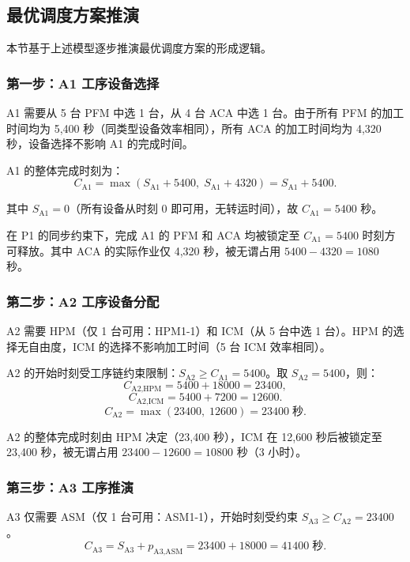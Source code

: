 \documentclass[UTF8,a4paper,12pt]{ctexart}
\begin{document}
\subsection{最优调度方案推演}
本节基于上述模型逐步推演最优调度方案的形成逻辑。

\subsubsection{第一步：A1 工序设备选择}
A1 需要从 5 台 PFM 中选 1 台，从 4 台 ACA 中选 1 台。由于所有 PFM 的加工时间均为 5,400 秒（同类型设备效率相同），所有 ACA 的加工时间均为 4,320 秒，设备选择不影响 A1 的完成时间。

A1 的整体完成时刻为：
\begin{equation}
C_{\text{A1}} = \max(S_{\text{A1}} + 5400, \; S_{\text{A1}} + 4320) = S_{\text{A1}} + 5400.
\end{equation}

其中 $S_{\text{A1}} = 0$（所有设备从时刻 0 即可用，无转运时间），故 $C_{\text{A1}} = 5400$ 秒。

在 P1 的同步约束下，完成 A1 的 PFM 和 ACA 均被锁定至 $C_{\text{A1}} = 5400$ 时刻方可释放。其中 ACA 的实际作业仅 4,320 秒，被无谓占用 $5400 - 4320 = 1080$ 秒。

\subsubsection{第二步：A2 工序设备分配}
A2 需要 HPM（仅 1 台可用：HPM1-1）和 ICM（从 5 台中选 1 台）。HPM 的选择无自由度，ICM 的选择不影响加工时间（5 台 ICM 效率相同）。

A2 的开始时刻受工序链约束限制：$S_{\text{A2}} \geq C_{\text{A1}} = 5400$。取 $S_{\text{A2}} = 5400$，则：
\begin{equation}
C_{\text{A2},\text{HPM}} = 5400 + 18000 = 23400,
\end{equation}
\begin{equation}
C_{\text{A2},\text{ICM}} = 5400 + 7200 = 12600.
\end{equation}
\begin{equation}
C_{\text{A2}} = \max(23400, \; 12600) = 23400 \; \text{秒}.
\end{equation}

A2 的整体完成时刻由 HPM 决定（23,400 秒），ICM 在 12,600 秒后被锁定至 23,400 秒，被无谓占用 $23400 - 12600 = 10800$ 秒（3 小时）。

\subsubsection{第三步：A3 工序推演}
A3 仅需要 ASM（仅 1 台可用：ASM1-1），开始时刻受约束 $S_{\text{A3}} \geq C_{\text{A2}} = 23400$。
\begin{equation}
C_{\text{A3}} = S_{\text{A3}} + p_{\text{A3},\text{ASM}} = 23400 + 18000 = 41400 \; \text{秒}.
\end{equation}
\end{document}
